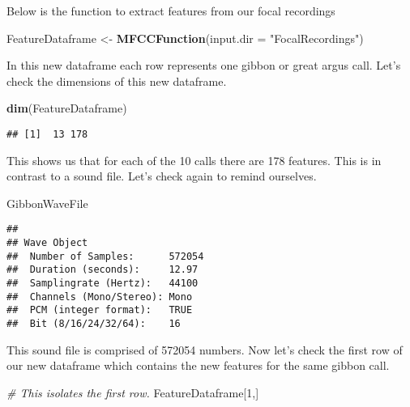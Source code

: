 \documentclass[]{book}
\newenvironment{Shaded}{\begin{snugshade}}{\end{snugshade}}
\newcommand{\CommentTok}[1]{\textcolor[rgb]{0.56,0.35,0.01}{\textit{#1}}}
\newcommand{\DataTypeTok}[1]{\textcolor[rgb]{0.13,0.29,0.53}{#1}}
\newcommand{\DecValTok}[1]{\textcolor[rgb]{0.00,0.00,0.81}{#1}}
\newcommand{\KeywordTok}[1]{\textcolor[rgb]{0.13,0.29,0.53}{\textbf{#1}}}
\newcommand{\NormalTok}[1]{#1}
\newcommand{\StringTok}[1]{\textcolor[rgb]{0.31,0.60,0.02}{#1}}
\begin{document}
Below is the function to extract features from our focal recordings

\begin{Shaded}
\begin{Highlighting}[]
\NormalTok{FeatureDataframe <-}\StringTok{ }\KeywordTok{MFCCFunction}\NormalTok{(}\DataTypeTok{input.dir =} \StringTok{"FocalRecordings"}\NormalTok{)}
\end{Highlighting}
\end{Shaded}

In this new dataframe each row represents one gibbon or great argus call. Let's check the dimensions of this new dataframe.

\begin{Shaded}
\begin{Highlighting}[]
\KeywordTok{dim}\NormalTok{(FeatureDataframe)}
\end{Highlighting}
\end{Shaded}

\begin{verbatim}
## [1]  13 178
\end{verbatim}

This shows us that for each of the 10 calls there are 178 features. This is in contrast to a sound file. Let's check again to remind ourselves.

\begin{Shaded}
\begin{Highlighting}[]
\NormalTok{GibbonWaveFile}
\end{Highlighting}
\end{Shaded}

\begin{verbatim}
## 
## Wave Object
##  Number of Samples:      572054
##  Duration (seconds):     12.97
##  Samplingrate (Hertz):   44100
##  Channels (Mono/Stereo): Mono
##  PCM (integer format):   TRUE
##  Bit (8/16/24/32/64):    16
\end{verbatim}

This sound file is comprised of 572054 numbers. Now let's check the first row of our new dataframe which contains the new features for the same gibbon call.

\begin{Shaded}
\begin{Highlighting}[]
\CommentTok{# This isolates the first row.}
\NormalTok{FeatureDataframe[}\DecValTok{1}\NormalTok{,] }
\end{Highlighting}
\end{Shaded}
\end{document}
